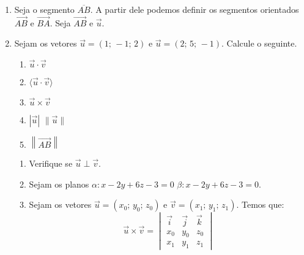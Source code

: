 \documentclass[a4paper,12pt]{article}
\begin{document}
\begin{enumerate}
\begin{comment}
Tags para geometria analítica
\end{comment}
\item Seja o segmento $\overline{AB}$. A partir dele podemos definir os segmentos orientados $\overrightarrow{AB}$
e $\overrightarrow{BA}$. Seja $\vec{AB}$ e $\vec{u}$.
\item Sejam os vetores $\vec{u} = (1;\,-1;\,2)$ e $\vec{u} = (2;\,5;\,-1)$. Calcule o seguinte.
\begin{enumerate}
\item $\vec{u} \cdot \vec{v}$
\item $\langle \vec{u} \cdot \vec{v} \rangle$
\item $\vec{u} \times \vec{v}$
\item $|\vec{u}|$ $\|\vec{u}\|$
\item $\left\|\overrightarrow{AB}\right\|$
\end{enumerate}
\begin{enumerate}
\item Verifique se $\vec{u} \perp \vec{v}$.
\item Sejam os planos $\alpha : x-2y+6z-3=0$ $\beta : x-2y+6z-3=0$.
\item Sejam os vetores $\vec{u}=(x_0;\,y_0;\,z_0)$ e $\vec{v}=(x_1;\,y_1;\,z_1)$. Temos que:
$$
\vec{u} \times \vec{v} =
\begin{vmatrix}
\vec{i} & \vec{j} & \vec{k}\\
x_0 & y_0 & z_0\\
x_1 & y_1 & z_1
\end{vmatrix}
$$
\end{enumerate}
\end{enumerate}
\end{document}
